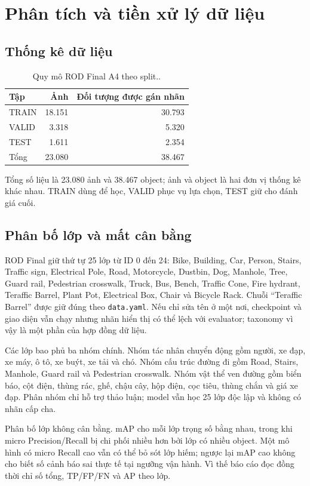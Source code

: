 \documentclass[12pt,a4paper,oneside]{report}
\begin{document}
\section{Phân tích và tiền xử lý dữ liệu}
\subsection{Thống kê dữ liệu}
\begin{table}[htbp]\centering
\caption{Quy mô ROD Final A4 theo split..}\label{tab:split}
\begin{tabular}{lrr}\toprule
Tập & Ảnh & Đối tượng được gán nhãn\\\midrule
TRAIN & 18.151 & 30.793\\
VALID & 3.318 & 5.320\\
TEST & 1.611 & 2.354\\\midrule
Tổng & 23.080 & 38.467\\\bottomrule
\end{tabular}
\end{table}
Tổng số liệu là 23.080 ảnh và 38.467 object; ảnh và object là hai đơn vị thống kê khác nhau. TRAIN dùng để học, VALID phục vụ lựa chọn, TEST giữ cho đánh giá cuối.
\subsection{Phân bố lớp và mất cân bằng}
ROD Final giữ thứ tự 25 lớp từ ID 0 đến 24: Bike, Building, Car, Person, Stairs, Traffic sign, Electrical Pole, Road, Motorcycle, Dustbin, Dog, Manhole, Tree, Guard rail, Pedestrian crosswalk, Truck, Bus, Bench, Traffic Cone, Fire hydrant, Teraffic Barrel, Plant Pot, Electrical Box, Chair và Bicycle Rack. Chuỗi ``Teraffic Barrel'' được giữ đúng theo \texttt{data.yaml}. Nếu chỉ sửa tên ở một nơi, checkpoint và giao diện vẫn chạy nhưng nhãn hiển thị có thể lệch với evaluator; taxonomy vì vậy là một phần của hợp đồng dữ liệu.

Các lớp bao phủ ba nhóm chính. Nhóm tác nhân chuyển động gồm người, xe đạp, xe máy, ô tô, xe buýt, xe tải và chó. Nhóm cấu trúc đường đi gồm Road, Stairs, Manhole, Guard rail và Pedestrian crosswalk. Nhóm vật thể ven đường gồm biển báo, cột điện, thùng rác, ghế, chậu cây, hộp điện, cọc tiêu, thùng chắn và giá xe đạp. Phân nhóm chỉ hỗ trợ thảo luận; model vẫn học 25 lớp độc lập và không có nhãn cấp cha.

Phân bố lớp không cân bằng. mAP cho mỗi lớp trọng số bằng nhau, trong khi micro Precision/Recall bị chi phối nhiều hơn bởi lớp có nhiều object. Một mô hình có micro Recall cao vẫn có thể bỏ sót lớp hiếm; ngược lại mAP cao không cho biết số cảnh báo sai thực tế tại ngưỡng vận hành. Vì thế báo cáo đọc đồng thời chỉ số tổng, TP/FP/FN và AP theo lớp.
\end{document}
